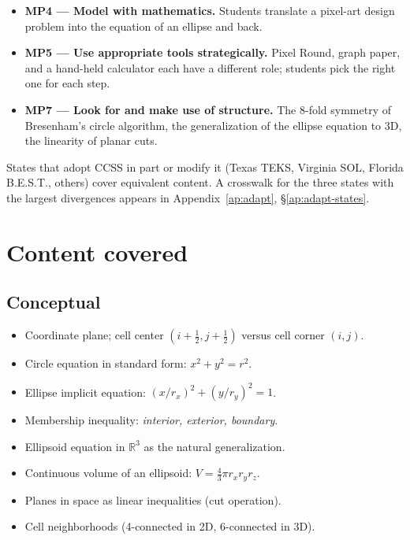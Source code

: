 \documentclass[12pt,letterpaper]{scrartcl}
\newcommand{\acc}[1]{\textcolor{accent}{\textbf{#1}}}
\begin{document}
\begin{itemize}[leftmargin=1.3em,itemsep=0.15em,topsep=0.3em]
  \item \acc{MP4 --- Model with mathematics.} Students translate a pixel-art design problem into the equation of an ellipse and back.
  \item \acc{MP5 --- Use appropriate tools strategically.} Pixel Round, graph paper, and a hand-held calculator each have a different role; students pick the right one for each step.
  \item \acc{MP7 --- Look for and make use of structure.} The 8-fold symmetry of Bresenham's circle algorithm, the generalization of the ellipse equation to 3D, the linearity of planar cuts.
\end{itemize}

\begin{note}
States that adopt CCSS in part or modify it (Texas TEKS, Virginia SOL, Florida B.E.S.T., others) cover equivalent content. A crosswalk for the three states with the largest divergences appears in Appendix~\ref{ap:adapt}, §\ref{ap:adapt-states}.
\end{note}

\section{Content covered}

\subsection{Conceptual}
\begin{itemize}[leftmargin=1.3em,itemsep=0.15em,topsep=0.3em]
  \item Coordinate plane; cell center $(i + \tfrac{1}{2}, j + \tfrac{1}{2})$ versus cell corner $(i, j)$.
  \item Circle equation in standard form: $x^2 + y^2 = r^2$.
  \item Ellipse implicit equation: $(x/r_x)^2 + (y/r_y)^2 = 1$.
  \item Membership inequality: \emph{interior, exterior, boundary}.
  \item Ellipsoid equation in $\mathbb{R}^3$ as the natural generalization.
  \item Continuous volume of an ellipsoid: $V = \tfrac{4}{3}\pi r_x r_y r_z$.
  \item Planes in space as linear inequalities (cut operation).
  \item Cell neighborhoods (4-connected in 2D, 6-connected in 3D).
\end{itemize}
\end{document}
